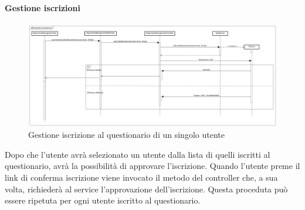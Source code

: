 \paragraph{Gestione iscrizioni}

\label{Gestione iscrizioni ai questionari}

\begin{figure}[ht]
	\centering
	\includegraphics[scale=0.25,keepaspectratio]{UML/DiagrammiDiSequenza/Front-end/SubscriptionManagement.png}
	\caption{Gestione iscrizione al questionario di un singolo utente}
\end{figure} \FloatBarrier

Dopo che l'utente avrà selezionato un utente dalla lista di quelli iscritti al questionario, avrà la possibilità di approvare l'iscrizione. Quando l'utente preme il link di conferma iscrizione viene invocato il metodo del controller che, a sua volta, richiederà al service l'approvazione dell'iscrizione. Questa proceduta può essere ripetuta per ogni utente iscritto al questionario.